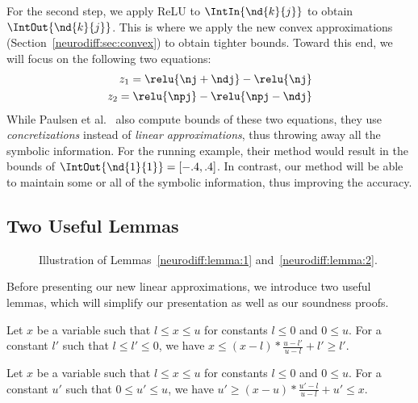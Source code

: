 For the second step, we apply ReLU to $ \IntIn{\nd{k}{j}} $ to obtain
$ \IntOut{\nd{k}{j}} $. This is where we apply the new convex
approximations (Section~\ref{neurodiff:sec:convex}) to obtain tighter bounds.
Toward this end, we will focus on the following two equations:
%
\begin{align}
z_1 = \relu{{\nj} + {\ndj}} - \relu{{\nj}} \label{neurodiff:eq:1}\\
z_2 = \relu{{\npj}} - \relu{{\npj} - {\ndj}} \label{neurodiff:eq:2}
\end{align}
%
While Paulsen et al.~\cite{paulsen2020reludiff} also compute bounds of these
two equations, they use \emph{concretizations} instead of \emph{linear
approximations}, thus throwing away all the symbolic information.  For
the running example, their method would result in the bounds of
$ \IntOut{\nd{1}{1}} = [-.4, .4] $. In contrast, our method will be
able to maintain some or all of the symbolic information, thus
improving the accuracy.




\subsection{Two Useful Lemmas}

\begin{figure}[t]
	\centering
	\scalebox{1.0}{}
	\caption{Illustration of Lemmas~\ref{neurodiff:lemma:1}
	and~\ref{neurodiff:lemma:2}.\label{neurodiff:fig:lemma_fig}}
\end{figure}

Before presenting our new linear approximations, we introduce two
useful lemmas, which will simplify our presentation as well as our
soundness proofs.

\begin{lemma}\label{neurodiff:lemma:1}
	Let $ x $ be a variable such that $ l \leq x \leq u $ for constants $ l \leq 0 $ and $ 0 \leq u $. For a constant $ l' $ such that $ l \leq l' \leq 0 $, we have $ x \leq (x - l) * \frac{u - l'}{u - l} + l' \geq l' $.
\end{lemma}
\begin{lemma}\label{neurodiff:lemma:2}
	Let $ x $ be a variable such that $ l \leq x \leq u $ for constants $ l \leq 0 $ and $ 0 \leq u $. For a constant $ u' $ such that $ 0 \leq u' \leq u $, we have $ u' \geq (x - u) * \frac{u' - l}{u - l} + u' \leq x $.
\end{lemma}


